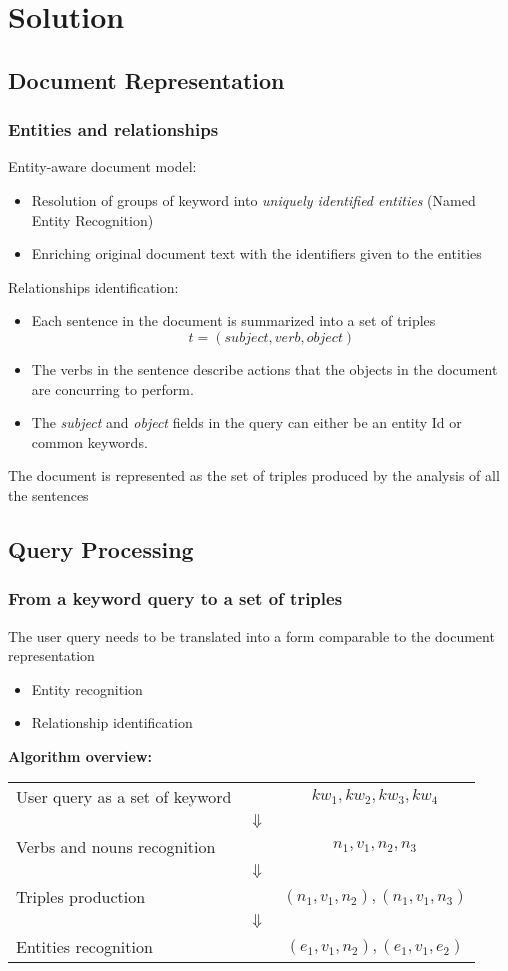 \documentclass{beamer}
\begin{document}
\section{Solution}
\subsection{Document Representation}

\begin{frame}
\frametitle{Entities and relationships}
Entity-aware document model:
\begin{itemize}
\item Resolution of groups of keyword into \emph{uniquely identified
  entities} (Named Entity Recognition)
\item Enriching original document text with the identifiers given to the entities
\end{itemize}
Relationships identification:
\begin{itemize}
\item Each sentence in the document is summarized into a set of
  triples
$$
t = (subject, verb, object)
$$
\item The verbs in the sentence describe actions that the objects in
  the document are concurring to perform.
\item The \emph{subject} and \emph{object} fields in the query can
  either be an entity Id or common keywords.
\end{itemize}
The document is represented as the set of triples produced by the
analysis of all the sentences
\end{frame}

\subsection{Query Processing}

\begin{frame}
\frametitle{From a keyword query to a set of triples}
The user query needs to be translated into a form comparable to the
document representation
\begin{itemize}
\item Entity recognition
\item Relationship identification
\end{itemize}
\vspace{5mm}
{\color{red}\bfseries{Algorithm overview:}}\\
\vspace{3mm}
\begin{tabular}{lcc}
User query as a set of keyword && $kw_{1}, kw_{2}, kw_{3}, kw_{4}$\\
& $\Downarrow$ &\\
Verbs and nouns recognition && $n_{1}, v_{1}, n_{2}, n_{3}$\\
& $\Downarrow$ &\\
Triples production && $(n_{1}, v_{1}, n_{2}), (n_{1}, v_{1}, n_{3})$\\
& $\Downarrow$ &\\
Entities recognition && $(e_{1}, v_{1}, n_{2}), (e_{1}, v_{1}, e_{2})$\\
\end{tabular}
\end{frame}
\end{document}
